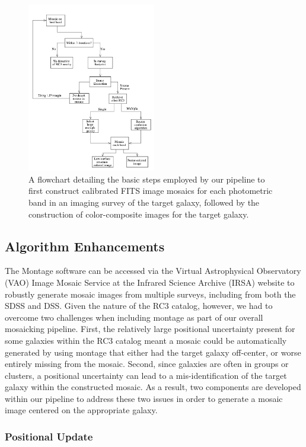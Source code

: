 \documentclass[authoryear, 12pt, 5p, times]{elsarticle}
\begin{document}
\begin{figure}[h]
\includegraphics[width=0.5\textwidth]{figures/algorithm.png}
\caption{A flowchart detailing the basic steps employed by our pipeline to first construct calibrated FITS image mosaics for each photometric band in an imaging survey of the target galaxy, followed by the construction of color-composite images for the target galaxy.}
\label{flowchart}
\end{figure}

\subsection{Algorithm Enhancements}

The Montage software can be accessed via the Virtual Astrophysical Observatory (VAO) Image Mosaic Service at the Infrared Science Archive (IRSA) website to robustly generate mosaic images from multiple surveys, including from both the SDSS and DSS. Given the nature of the RC3 catalog, however, we had to overcome two challenges when including montage as part of our overall mosaicking pipeline. First, the relatively large positional uncertainty present for some galaxies within the RC3 catalog meant a mosaic could be automatically generated by using montage that either had the target galaxy off-center, or worse entirely missing from the mosaic. Second, since galaxies are often in groups or clusters, a positional uncertainty can lead to a mis-identification of the target galaxy within the constructed mosaic. As a result, two components are developed within our pipeline to address these two issues in order to generate a mosaic image centered on the appropriate galaxy.

\subsubsection{Positional Update\label{pos-sec}} 
\end{document}
